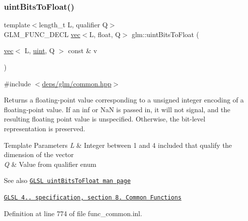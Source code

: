 \subsubsection{\texorpdfstring{uint\+Bits\+To\+Float()}{uintBitsToFloat()}\hspace{0.1cm}{\footnotesize\ttfamily [2/2]}}
{\footnotesize\ttfamily template$<$length\+\_\+t L, qualifier Q$>$ \\
G\+L\+M\+\_\+\+F\+U\+N\+C\+\_\+\+D\+E\+CL \hyperlink{structglm_1_1vec}{vec}$<$L, float, Q$>$ glm\+::uint\+Bits\+To\+Float (\begin{DoxyParamCaption}\item[{\hyperlink{structglm_1_1vec}{vec}$<$ L, \hyperlink{group__core__precision_ga4fd29415871152bfb5abd588334147c8}{uint}, Q $>$ const \&}]{v }\end{DoxyParamCaption})}



{\ttfamily \#include $<$\hyperlink{common_8hpp}{deps/glm/common.\+hpp}$>$}

Returns a floating-\/point value corresponding to a unsigned integer encoding of a floating-\/point value. If an inf or NaN is passed in, it will not signal, and the resulting floating point value is unspecified. Otherwise, the bit-\/level representation is preserved.


\begin{DoxyTemplParams}{Template Parameters}
{\em L} & Integer between 1 and 4 included that qualify the dimension of the vector \\
\hline
{\em Q} & Value from qualifier enum\\
\hline
\end{DoxyTemplParams}
\begin{DoxySeeAlso}{See also}
\href{http://www.opengl.org/sdk/docs/manglsl/xhtml/uintBitsToFloat.xml}{\tt G\+L\+SL uint\+Bits\+To\+Float man page} 

\href{http://www.opengl.org/registry/doc/GLSLangSpec.4.20.8.pdf}{\tt G\+L\+SL 4.. specification, section 8. Common Functions} 
\end{DoxySeeAlso}


Definition at line 774 of file func\+\_\+common.\+inl.

